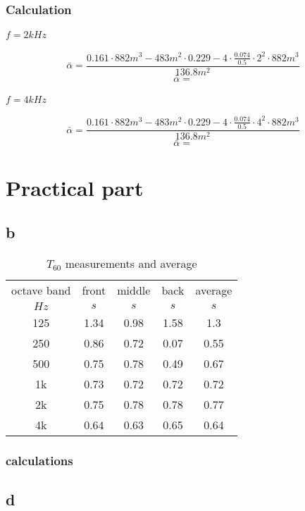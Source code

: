\documentclass{article}
\begin{document}
			\subsubsection{Calculation}
				\paragraph{$f=2kHz$}
					$$\bar{\alpha}=\frac{0.161\cdot 882m^3-483m^2\cdot 0.229-4\cdot \frac{0.074}{0.5}\cdot 2^2\cdot 882m^3}{136.8m^2}$$
					$$\bar{\alpha}=$$
				\paragraph{$f=4kHz$}
					$$\bar{\alpha}=\frac{0.161\cdot 882m^3-483m^2\cdot 0.229-4\cdot \frac{0.074}{0.5}\cdot 4^2\cdot 882m^3}{136.8m^2}$$
					$$\bar{\alpha}=$$
	\section{Practical part}
\subsection{b}
\begin{table}
\begin{center}
\begin{tabular}{|c||c|c|c||c|}
\hline
octave band & front & middle & back & average	\\
$Hz$		&	$s$	&	$s$		&	$s$		&	$s$		\\
\hline
\hline
125			& 1.34	&	0.98	&	1.58	&	1.3		\\
\hline
250			& 0.86	&	0.72	&	0.07	&	0.55	\\
\hline
500			& 0.75	& 	0.78	&	0.49	&	0.67	\\
\hline
1k			& 0.73	&	0.72	&	0.72	&	0.72	\\
\hline
2k			& 0.75	&	0.78	&	0.78	&	0.77	\\
\hline
4k			& 0.64	&	0.63	&	0.65	& 	0.64	\\
\hline


\end{tabular}
\caption{$T_{60}$ measurements and average}
\label{tab:Tmeasurements}
\end{center}
\end{table}
\subsubsection{calculations}

\subsection{d}
\end{document}
